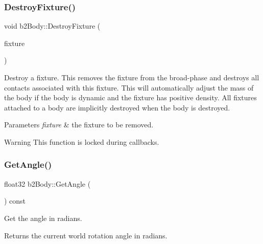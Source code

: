 \subsubsection{\texorpdfstring{Destroy\+Fixture()}{DestroyFixture()}\hspace{0.1cm}{\footnotesize\ttfamily [2/2]}}
{\footnotesize\ttfamily void b2\+Body\+::\+Destroy\+Fixture (\begin{DoxyParamCaption}\item[{\hyperlink{classb2Fixture}{b2\+Fixture} $\ast$}]{fixture }\end{DoxyParamCaption})}

Destroy a fixture. This removes the fixture from the broad-\/phase and destroys all contacts associated with this fixture. This will automatically adjust the mass of the body if the body is dynamic and the fixture has positive density. All fixtures attached to a body are implicitly destroyed when the body is destroyed. 
\begin{DoxyParams}{Parameters}
{\em fixture} & the fixture to be removed. \\
\hline
\end{DoxyParams}
\begin{DoxyWarning}{Warning}
This function is locked during callbacks. 
\end{DoxyWarning}
\mbox{\label{classb2Body_a20b9c8d0d722edf3af281034d37bd534}} 
\subsubsection{\texorpdfstring{Get\+Angle()}{GetAngle()}\hspace{0.1cm}{\footnotesize\ttfamily [1/2]}}
{\footnotesize\ttfamily float32 b2\+Body\+::\+Get\+Angle (\begin{DoxyParamCaption}{ }\end{DoxyParamCaption}) const\hspace{0.3cm}{\ttfamily [inline]}}

Get the angle in radians. \begin{DoxyReturn}{Returns}
the current world rotation angle in radians. 
\end{DoxyReturn}
\mbox{\label{classb2Body_a20b9c8d0d722edf3af281034d37bd534}} 
